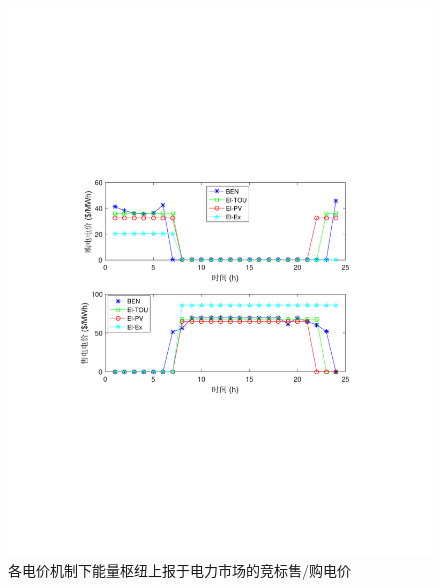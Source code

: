 \begin{figure}[!htp]
\centering
\includegraphics[scale=0.76]{figures/Chap4-10-ComparePrice.pdf}
\caption{各电价机制下能量枢纽上报于电力市场的竞标售/购电价}
\label{Fig:PriceBidComp}
\end{figure}

